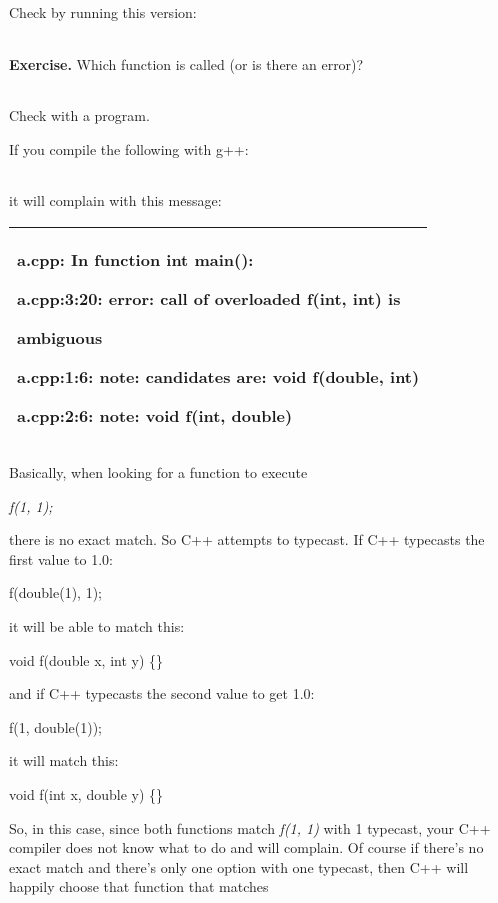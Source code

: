 \documentclass[
]{article}
\begin{document}
Check by running this version:

\begin{longtable}[]{@{}@{}}
\toprule
\endhead
\bottomrule
\end{longtable}

\textbf{Exercise.} Which function is called (or is there an error)?

\begin{longtable}[]{@{}@{}}
\toprule
\endhead
\bottomrule
\end{longtable}

Check with a program.

If you compile the following with g++:

\begin{longtable}[]{@{}@{}}
\toprule
\endhead
\bottomrule
\end{longtable}

it will complain with this message:

\begin{longtable}[]{@{}l@{}}
\toprule
\endhead
\begin{minipage}[t]{0.97\columnwidth}\raggedright
a.cpp: In function int main():

a.cpp:3:20: error: call of overloaded f(int, int) is

ambiguous

a.cpp:1:6: note: candidates are: void f(double, int)

a.cpp:2:6: note: void f(int, double)\strut
\end{minipage}\tabularnewline
\bottomrule
\end{longtable}

Basically, when looking for a function to execute

\emph{f(1, 1);}

there is no exact match. So C++ attempts to typecast. If C++ typecasts
the first value to 1.0:

f(double(1), 1);

it will be able to match this:

void f(double x, int y) \{\}

and if C++ typecasts the second value to get 1.0:

f(1, double(1));

it will match this:

void f(int x, double y) \{\}

So, in this case, since both functions match \emph{f(1, 1)} with 1
typecast, your C++ compiler does not know what to do and will complain.
Of course if there's no exact match and there's only one option with one
typecast, then C++ will happily choose that function that matches
\end{document}
